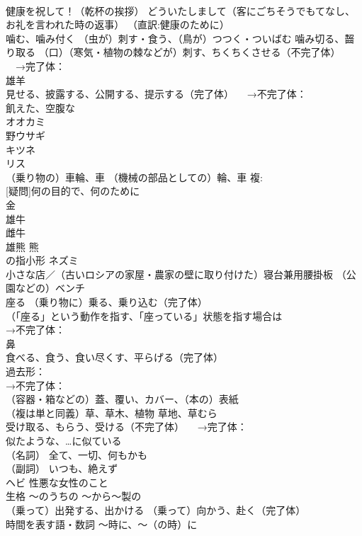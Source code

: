 \documentclass[8pt]{extreport}
\begin{document}
\begin{CJK}{UTF8}{min}
\\	健康を祝して！（乾杯の挨拶） どういたしまして（客にごちそうでもてなし、お礼を言われた時の返事） （直訳:健康のために）
\\	噛む、噛み付く （虫が）刺す・食う、（鳥が）つつく・ついばむ 噛み切る、齧り取る （口）（寒気・植物の棘などが）刺す、ちくちくさせる（不完了体） 　→完了体：
\\	雄羊
\\	見せる、披露する、公開する、提示する（完了体） 　→不完了体：
\\	飢えた、空腹な
\\	オオカミ
\\	野ウサギ 
\\	キツネ
\\	リス
\\	（乗り物の）車輪、車 （機械の部品としての）輪、車 複:
\\	[関係][疑問]何の目的で、何のために
\\	金
\\	雄牛
\\	雌牛
\\	雄熊 熊
\\	の指小形 ネズミ
\\	小さな店／（古いロシアの家屋・農家の壁に取り付けた）寝台兼用腰掛板 （公園などの）ベンチ
\\	座る （乗り物に）乗る、乗り込む（完了体） 
\\	（「座る」という動作を指す、「座っている」状態を指す場合は
\\	→不完了体：
\\	鼻
\\	食べる、食う、食い尽くす、平らげる（完了体） 
\\	過去形：
\\	→不完了体：
\\	（容器・箱などの）蓋、覆い、カバー、（本の）表紙
\\	（複は単と同義）草、草木、植物 草地、草むら
\\	受け取る、もらう、受ける（不完了体） 　→完了体：
\\	似たような、…に似ている
\\	（名詞）	全て、一切、何もかも
\\	（副詞）	いつも、絶えず
\\	ヘビ 性悪な女性のこと
\\	生格	～のうちの ～から〜製の
\\	（乗って）出発する、出かける （乗って）向かう、赴く（完了体）
\\	時間を表す語・数詞	～時に、～（の時）に

\end{CJK}
\end{document}
